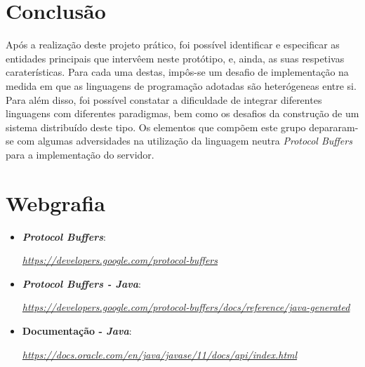 \documentclass[a4paper]{report}
\begin{document}
\chapter{Conclusão}
Após a realização deste projeto prático, foi possível identificar e especificar as entidades principais que intervêem neste protótipo, e, ainda, as suas respetivas caraterísticas. Para cada uma destas, impôs-se um desafio 
de implementação na medida em que as linguagens de programação adotadas são heterógeneas entre si.
Para além disso, foi possível constatar a dificuldade de integrar diferentes linguagens com diferentes paradigmas, bem como os desafios da construção de um sistema distribuído deste tipo.
Os elementos que compõem este grupo depararam-se com algumas adversidades na utilização da linguagem neutra \textit{Protocol Buffers} para a implementação do servidor.


\chapter{Webgrafia}
	\begin{itemize}
		\item \textbf{\textit{Protocol Buffers}}:
		\par \textit{\url{https://developers.google.com/protocol-buffers}}
        \item \textbf{\textit{Protocol Buffers - Java}}:
		\par \textit{\url{https://developers.google.com/protocol-buffers/docs/reference/java-generated}}
		\item \textbf{Documentação - \textit{Java}}:
		\par \textit{\url{https://docs.oracle.com/en/java/javase/11/docs/api/index.html}}
    \end{itemize}
\end{document}

